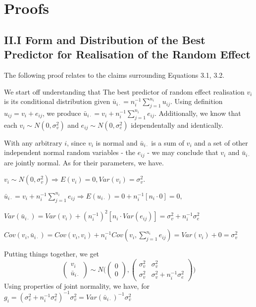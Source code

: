\documentclass[11pt,letter]{article}
\begin{document}
\section{Proofs}

\subsection{II.I Form and Distribution of the Best Predictor for Realisation of the Random Effect}\vspace{0.15cm}

The following proof relates to the claims surrounding Equations 3.1, 3.2.

We start off understanding that The best predictor of random effect realisation $v_i$ is its conditional distribution given $\bar u_{i\cdot}=n^{-1}_i\sum_{j=1}^{n_i}u_{ij}$. Using definition $u_{ij}=v_i+e_{ij}$, we produce $\bar u_{i\cdot}=v_i+n_i^{-1}\sum_{j=1}^{n_i}e_{ij}$. Additionally, we know that each $v_i\sim N(0,\sigma^2_v)$ and $e_{ij}\sim N(0,\sigma^2_e)$ idependentally and identically.

With any arbitrary $i$, since $v_i$ is normal and $\bar u_{i\cdot}$ is a sum of $v_i$ and a set of other independent normal random variables - the $e_{ij}$ - we may conclude that $v_i$ and $\bar u_{i\cdot}$ are jointly normal. As for their parameters, we have.

\hspace{2cm}$v_i\sim N(0,\sigma^2_v)\Rightarrow E(v_i)=0, Var(v_i)=\sigma^2_v$.

\hspace{2cm}$\bar u_{i\cdot}=v_i+n_i^{-1}\sum_{j=1}^{n_i}e_{ij}\Rightarrow E(u_{i\cdot})=0+n_i^{-1}[n_i\cdot 0]=0,$

\hspace{5cm}$Var(\bar u_{i\cdot})=Var(v_i)+(n^{-1}_i)^2[n_i\cdot Var(e_{ij})]=\sigma^2_v+n_i^{-1}\sigma^2_e$

\hspace{2cm}$Cov(v_i,\bar u_{i\cdot})=Cov(v_i,v_i)+n^{-1}_iCov(v_i,\sum_{j=1}^{n_i}e_{ij})=Var(v_i)+0=\sigma^2_v$

Putting things together, we get
$$\begin{pmatrix} v_i \\ \bar u_{i\cdot} \end{pmatrix}\sim N\Bigg(\begin{pmatrix}0\\0\end{pmatrix},\begin{pmatrix} \sigma^2_v & \sigma^2_v \\ \sigma^2_v & \sigma^2_v+n_i^{-1}\sigma^2_e\end{pmatrix}\Bigg)$$
Using properties of joint normality, we have, for $g_i=(\sigma^2_v+n_i^{-1}\sigma^2_e)^{-1}\sigma^2_v=Var(\bar u_{i\cdot})^{-1}\sigma^2_v$
\end{document}
